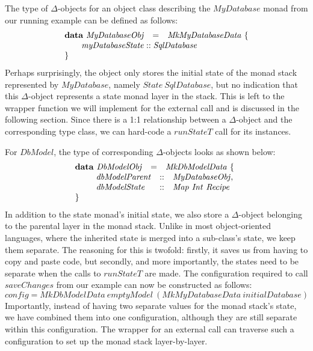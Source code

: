 The type of $\Delta$-objects for an object class describing the $\mathit{MyDatabase}$ monad from our running example can be defined as follows:
\begin{displaymath}
\begin{array}{lcl}
\mathbf{data}~\mathit{MyDatabaseObj} & = & \mathit{MkMyDatabaseData}~\{ \\
\multicolumn{3}{l}{\qquad \mathit{myDatabaseState} :: \mathit{SqlDatabase} }  \\
\} && 
\end{array}
\end{displaymath}
Perhaps surprisingly, the object only stores the initial state of the monad stack represented by $\mathit{MyDatabase}$, namely $\mathit{State}~\mathit{SqlDatabase}$, but no indication that this $\Delta$-object represents a state monad layer in the stack. This is left to the wrapper function we will implement for the external call and is discussed in the following section. Since there is a 1:1 relationship between a $\Delta$-object and the corresponding type class, we can hard-code a $\mathit{runStateT}$ call for its instances.

For $\mathit{DbModel}$, the type of corresponding $\Delta$-objects looks as shown below:
\begin{displaymath}
\begin{array}{lcl}
\mathbf{data}~\mathit{DbModelObj} & = & \mathit{MkDbModelData}~\{ \\
\multicolumn{3}{l}{\qquad \begin{array}{lcl}
\mathit{dbModelParent} & :: & \mathit{MyDatabaseObj}, \\
\mathit{dbModelState} & :: & \mathit{Map}~\mathit{Int}~\mathit{Recipe}
\end{array}  }  \\
\} && 
\end{array}
\end{displaymath}
In addition to the state monad's initial state, we also store a $\Delta$-object belonging to the parental layer in the monad stack. Unlike in most object-oriented languages, where the inherited state is merged into a sub-class's state, we keep them separate. The reasoning for this is twofold: firstly, it saves us from having to copy and paste code, but secondly, and more importantly, the states need to be separate when the calls to $\mathit{runStateT}$ are made. The configuration required to call $\mathit{saveChanges}$ from our example can now be constructed as follows:
\begin{displaymath}
\mathit{config} = \mathit{MkDbModelData}~\mathit{emptyModel}~(\mathit{MkMyDatabaseData}~\mathit{initialDatabase})
\end{displaymath}
Importantly, instead of having two separate values for the monad stack's state, we have combined them into one configuration, although they are still separate within this configuration. The wrapper for an external call can traverse such a configuration to set up the monad stack layer-by-layer.

